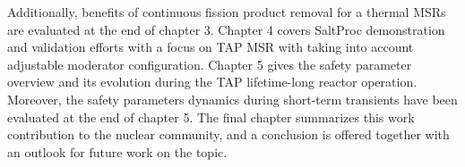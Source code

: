 Additionally, benefits of continuous fission product removal for a thermal 
\glspl{MSR} are evaluated at the end of chapter 3. Chapter 4 covers SaltProc 
demonstration and validation efforts with a focus on \gls{TAP} \gls{MSR} with 
taking into account adjustable moderator configuration. Chapter 5 gives the 
safety parameter overview and its evolution during the \gls{TAP} 
lifetime-long reactor operation. Moreover, the safety parameters dynamics 
during short-term transients have been evaluated at the end of chapter 5. The 
final chapter summarizes this work contribution to the nuclear community, and 
a conclusion is offered together with an outlook for future work on the topic.